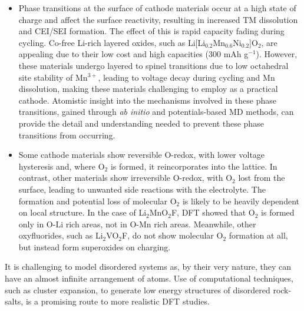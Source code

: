 \documentclass[../main.tex]{subfiles}
\begin{document}
\begin{itemize}
    \item Phase transitions at the surface of cathode materials occur at a high state of charge and affect the surface reactivity, resulting in increased TM dissolution and CEI/SEI formation. The effect of this is rapid capacity fading during cycling.\cite{li2019comprehensive} Co-free Li-rich layered oxides, such as Li[Li$_{0.2}$Mn$_{0.6}$Ni$_{0.2}$]O$_{2}$, are appealing due to their low cost and high capacities (300 mAh g$^{-1}$).\cite{kim2004electrochemical,armstrong2006demonstrating} However, these materials undergo layered to spinel transitions due to low octahedral site stability of Mn$^{3+}$, leading to voltage decay during cycling and Mn dissolution,\cite{MnDissolution2016} making these materials challenging to employ as a practical cathode. Atomistic insight into the mechanisms involved in these phase transitions, gained through \textit{ab initio} and potentials-based MD methods, can provide the detail and understanding needed to prevent these phase transitions from occurring.
    \item Some cathode materials show reversible O-redox, with lower voltage hysteresis and, where O$_2$ is formed, it reincorporates into the lattice.\cite{Sharpe2020} In contrast, other materials show irreversible O-redox, with O$_2$ lost from the surface,\cite{Nakayama2020, Chen2016, House2020a} leading to unwanted side reactions with the electrolyte. The formation and potential loss of molecular O$_2$ is likely to be heavily dependent on local structure. In the case of Li$_2$MnO$_2$F, DFT showed that O$_2$ is formed only in O-Li rich areas, not in O-Mn rich areas.\cite{Sharpe2020} Meanwhile, other oxyfluorides, such as Li$_2$VO$_2$F, do not show molecular O$_2$ formation at all, but instead form superoxides on charging.\cite{Chang2020} 
\end{itemize}

It is challenging to model disordered systems as, by their very nature, they can have an almost infinite arrangement of atoms. Use of computational techniques, such as cluster expansion, to generate low energy structures of disordered rock-salts, is a promising route to more realistic DFT studies.\cite{Lun2020}
\end{document}
